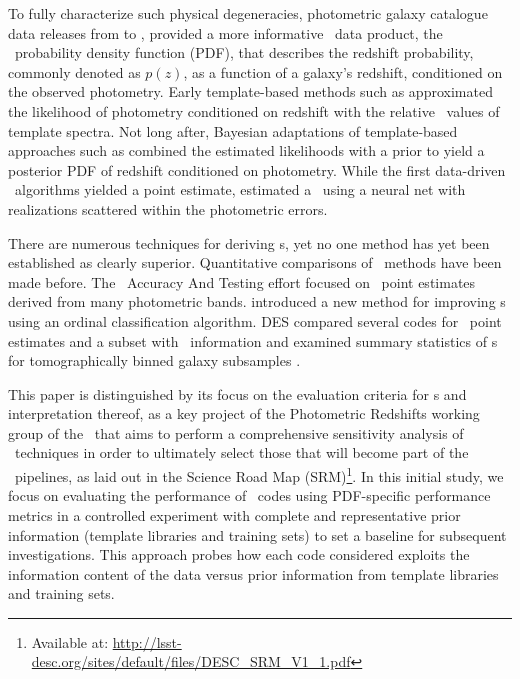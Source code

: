 To fully characterize such physical degeneracies, photometric galaxy catalogue data releases from \citep{Mandelbaum:2008} to \citep{de_Jong:17}, provided a more informative \pz\ data product, the \pz\ probability density function (PDF), that describes the redshift probability, commonly denoted as $p(z)$, as a function of a galaxy's redshift, conditioned on the observed photometry.
Early template-based methods such as \citet{Fernandezsoto:99} approximated the likelihood of photometry conditioned on redshift with the relative \chisq\ values of template spectra.
Not long after, Bayesian adaptations of template-based approaches such as \citet{Benitez:00} combined the estimated likelihoods with a prior to yield a posterior PDF of redshift conditioned on photometry.
While the first data-driven \pz\ algorithms yielded a point estimate, \citet{Firth:03} estimated a \pzpdf\ using a neural net with realizations scattered within the photometric errors.

There are numerous techniques for deriving \pzpdf s, yet no one method has yet been established as clearly superior.
Quantitative comparisons of \pz\ methods have been made before.
The \Pz\ Accuracy And Testing \citep[\textsc{PHAT},][]{Hildebrandt:10} effort focused on \pz\ point estimates derived from many photometric bands.
\citet{Rau:2015} introduced a new method for improving \pzpdf s using an ordinal classification algorithm.
\textsc{DES} compared several codes for \pz\ point estimates and a subset with \pzpdf\ information \citep{Sanchez:14} and examined summary statistics of \pzpdf s for tomographically binned galaxy subsamples \citep{Bonnett:16}.

This paper is distinguished by its focus on the evaluation criteria for \pzpdf s and interpretation thereof, as a key project of the Photometric Redshifts working group of the \desc\ that aims to perform a comprehensive sensitivity analysis of \pzpdf\ techniques in order to ultimately select those that will become part of the \lsst\ pipelines, as laid out in the Science Road Map (SRM)\footnote{Available at: \url{http://lsst-desc.org/sites/default/files/DESC_SRM_V1_1.pdf}\label{lsstdesc_srm}}.
In this initial study, we focus on evaluating the performance of \pzpdf\ codes using PDF-specific performance metrics in a controlled experiment with complete and representative prior information (template libraries and training sets) to set a baseline for subsequent investigations.
This approach probes how each code considered exploits the information content of the data versus prior information from template libraries and training sets.

